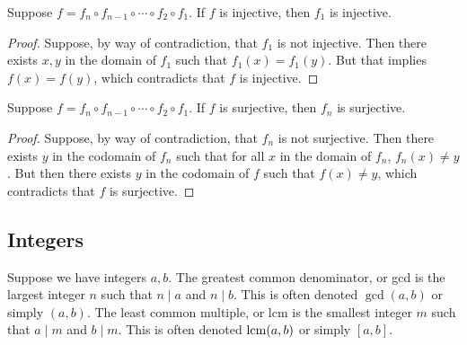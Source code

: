 \begin{theorem}\label{thm:composite-injection}
    Suppose \(f = f_n \circ f_{n-1} \circ \cdots \circ f_2 \circ f_1\).
    If \(f\) is injective, then \(f_1\) is injective.
\end{theorem}
\begin{proof}
    Suppose, by way of contradiction, that \(f_1\) is not injective.
    Then there exists \(x,y\) in the domain of \(f_1\)
    such that \(f_1(x) = f_1(y)\).
    But that implies \(f(x) = f(y)\),
    which contradicts that \(f\) is injective.
\end{proof}
\begin{theorem}\label{thm:composite-surjective}
    Suppose \(f = f_n \circ f_{n-1} \circ \cdots \circ f_2 \circ f_1\).
    If \(f\) is surjective, then \(f_n\) is surjective.
\end{theorem}
\begin{proof}
    Suppose, by way of contradiction, that \(f_n\) is not surjective.
    Then there exists \(y\) in the codomain of \(f_n\)
    such that for all \(x\) in the domain of \(f_n\),
    \(f_n(x) \neq y\).
    But then there exists \(y\) in the codomain of \(f\)
    such that \(f(x) \neq y\),
    which contradicts that \(f\) is surjective.
\end{proof}

\subsection{Integers}

\begin{definition}
    Suppose we have integers \(a,b\).
    The greatest common denominator, or gcd
    is the largest integer \(n\) such that \(n \mid a\) and \(n \mid b\).
    This is often denoted \(\gcd(a,b)\) or simply \((a,b)\).
    The least common multiple, or lcm
    is the smallest integer \(m\) such that \(a \mid m\) and \(b \mid m\).
    This is often denoted \(\operatorname{lcm}(a,b)\) or simply \([a,b]\).
\end{definition}

